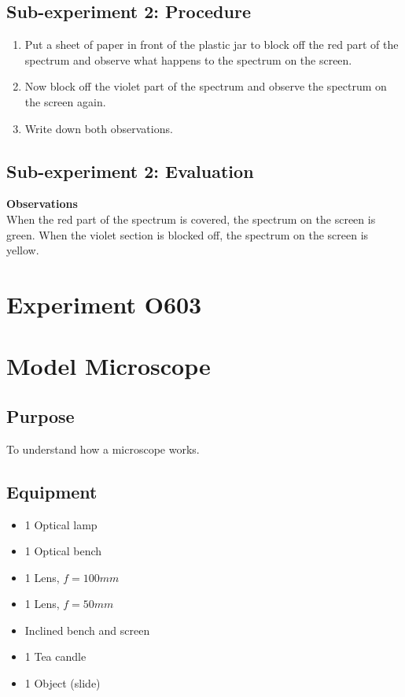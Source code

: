 \documentclass[12pt]{article}
\begin{document}
\subsection*{Sub-experiment 2: Procedure}
\begin{enumerate}
    \item Put a sheet of paper in front of the plastic jar to block off the red part of the spectrum and observe what happens to the spectrum on the screen. 
    \item Now block off the violet part of the spectrum and observe the spectrum on the screen again. 
    \item Write down both observations.
\end{enumerate}

\subsection*{Sub-experiment 2: Evaluation}
\textbf{Observations}\\
When the red part of the spectrum is covered, the spectrum on the screen is green. When the violet section is blocked off, the spectrum on the screen is yellow. 

\newpage

\section*{Experiment O603}

\section*{Model Microscope}

\subsection*{Purpose}

To understand how a microscope works.

\subsection*{Equipment}

\begin{itemize}
\item 1 Optical lamp
\item 1 Optical bench
\item 1 Lens, $f=100 mm$
\item 1 Lens, $f=50 mm$
\item Inclined bench and screen
\item 1 Tea candle
\item 1 Object (slide)
\end{itemize}
\end{document}
